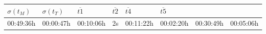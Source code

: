 \begin{longtable}[]{@{}llllllll@{}}
\begin{minipage}[b]{0.09\columnwidth}
\(\sigma(t_M)\)\strut
\end{minipage} & \begin{minipage}[b]{0.09\columnwidth}\raggedright
\(\sigma(t_T)\)\strut
\end{minipage} & \begin{minipage}[b]{0.10\columnwidth}\raggedright
\(\overline{t1}\)\strut
\end{minipage} & \begin{minipage}[b]{0.10\columnwidth}\raggedright
\(\overline{t2}\)\strut
\end{minipage} & \begin{minipage}[b]{0.10\columnwidth}\raggedright
\(\overline{t4}\)\strut
\end{minipage} & \begin{minipage}[b]{0.10\columnwidth}\raggedright
\(\overline{t5}\)\strut
\end{minipage}\tabularnewline
\midrule
\endhead
\begin{minipage}[t]{0.11\columnwidth}\raggedright
00:49:36h\strut
\end{minipage} & \begin{minipage}[t]{0.11\columnwidth}\raggedright
00:00:47h\strut
\end{minipage} & \begin{minipage}[t]{0.09\columnwidth}\raggedright
00:10:06h\strut
\end{minipage} & \begin{minipage}[t]{0.09\columnwidth}\raggedright
2s\strut
\end{minipage} & \begin{minipage}[t]{0.10\columnwidth}\raggedright
00:11:22h\strut
\end{minipage} & \begin{minipage}[t]{0.10\columnwidth}\raggedright
00:02:20h\strut
\end{minipage} & \begin{minipage}[t]{0.10\columnwidth}\raggedright
00:30:49h\strut
\end{minipage} & \begin{minipage}[t]{0.10\columnwidth}\raggedright
00:05:06h\strut
\end{minipage}\tabularnewline
\bottomrule
\end{longtable}

